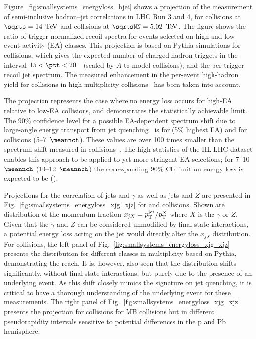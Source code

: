 \documentclass[../report.tex]{subfiles}
\begin{document}
Figure~\ref{fig:smallsystems_energyloss_hjet} shows a projection of the measurement of semi-inclusive hadron--jet correlations in LHC Run 3 and 4, for \pp collisions at $\sqrts = \unit[14]{\UTeV}$ and \pPb collisions at $\sqrtsNN = \unit[5.02]{\UTeV}$. The figure shows the ratio of trigger-normalized recoil spectra for events selected on high and low event-activity (EA) classes. 
This projection is based on Pythia simulations for \pp collisions, which gives the expected number of charged-hadron triggers in the interval $15<\ptt<20$~\UGeV\ (scaled by $A$ to model \pPb collisions), and the per-trigger recoil jet spectrum. The measured enhancement in the per-event high-\pT hadron yield for \pp collisions in high-multiplicity collisions~\cite{Acharya:2018orn} has been taken into account.

The projection represents the case where no energy loss occurs for high-EA relative to low-EA collisions, and demonstrates the statistically achievable limit. The 90\% confidence level for a possible EA-dependent spectrum shift due to large-angle energy transport from jet quenching~\cite{Acharya:2017okq} is \unit[70]{\UMeVc} for \pPb (5\% highest EA) and \unit[21]{\UMeVc} for \pp collisions (5--7~$\meannch$). These values are over 100 times smaller than the spectrum shift measured in \PbPb collisions~\cite{Adam:2015doa}. The high statistics of the HL-LHC dataset enables this approach to be applied to yet more stringent EA selections; for 7--10~$\meannch$ (10--12~$\meannch$) the corresponding 90\% CL limit on energy loss is expected to be \unit[69]{\UMeVc} (\unit[590]{\UMeVc}).

Projections for the correlation of jets and $\gamma$ as well as jets and $Z$ are presented in Fig.~\ref{fig:smallsystems_energyloss_xjg_xjz} for \pp and \pPb collisions. Shown are distribution of the momentum fraction $x_{jX} = p\sb{\scriptstyle\mathrm{T}}^{\rm jet}/p\sb{\scriptstyle\mathrm{T}}^X$ where $X$ is the $\gamma$ or $Z$. Given that the $\gamma$ and $Z$ can be considered unmodified by final-state interactions, a potential energy loss acting on the jet would directly alter the $x_{jX}$ distribution. For \pp collisions, the left panel of Fig.~\ref{fig:smallsystems_energyloss_xjg_xjz} presents the distribution for different classes in multiplicity based on Pythia, demonstrating the reach. 
It is, however, also seen that the distribution shifts significantly, without final-state interactions, but purely due to the presence of an underlying event. 
As this shift closely mimics the signature on jet quenching, it is critical to have a thorough understanding of the underlying event for these measurements.
The right panel of Fig.~\ref{fig:smallsystems_energyloss_xjg_xjz} presents the projection for \pPb collisions for MB collisions but in different pseudorapidity intervals sensitive to potential differences in the p and Pb hemisphere.
\end{document}
